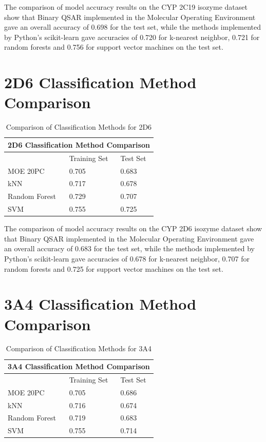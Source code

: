 The comparison of model accuracy results on the CYP 2C19 isozyme dataset show that Binary QSAR implemented in the Molecular Operating Environment gave an overall accuracy of 0.698 for the test set, while the methods implemented by Python's scikit-learn gave accuracies of 0.720 for k-nearest neighbor, 0.721 for random forests and 0.756 for support vector machines on the test set.

\section{2D6 Classification Method Comparison}

\begin{table}[H]
\caption{Comparison of Classification Methods for 2D6}
\centering
\begin{tabular}{|l|l|l|}
\hline
\multicolumn{3}{|c|}{2D6 Classification Method Comparison} \\ \hline
          & Training Set & Test Set \\ \hline
MOE 20PC  & 0.705        & 0.683    \\ \hline
kNN       & 0.717        & 0.678    \\ \hline
Random Forest & 0.729    & 0.707    \\ \hline
SVM       & 0.755        & 0.725    \\ \hline
\end{tabular}
\end{table}

The comparison of model accuracy results on the CYP 2D6 isozyme dataset show that Binary QSAR implemented in the Molecular Operating Environment gave an overall accuracy of 0.683 for the test set, while the methods implemented by Python's scikit-learn gave accuracies of 0.678 for k-nearest neighbor, 0.707 for random forests and 0.725 for support vector machines on the test set.


\section{3A4 Classification Method Comparison}

\begin{table}[H]
\caption{Comparison of Classification Methods for 3A4}
\centering
\begin{tabular}{|l|l|l|}
\hline
\multicolumn{3}{|c|}{3A4 Classification Method Comparison} \\ \hline
          & Training Set & Test Set \\ \hline
MOE 20PC  & 0.705        & 0.686    \\ \hline
kNN       & 0.716        & 0.674    \\ \hline
Random Forest & 0.719    & 0.683    \\ \hline
SVM       & 0.755        & 0.714    \\ \hline
\end{tabular}
\end{table}

